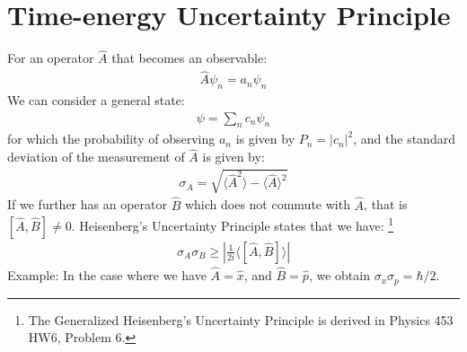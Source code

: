 \documentclass[11pt]{book}
\theoremstyle{break}
\theoremstyle{break}
\newcommand{\example}{\color{green}Example: \color{black}}
\begin{document}
\newpage
\section[Time-energy Uncertainty Principle]{\color{red}Time-energy Uncertainty Principle\color{black}}
For an operator $\hat{A}$ that becomes an observable:
\begin{align*}
\hat{A}\psi_n  = a_n \psi_n
\end{align*}
We can consider a general state:
\begin{align*}
\psi = \sum_n c_n \psi_n
\end{align*}
for which the probability of observing $a_n$ is given by $P_n = |c_n|^2$, and the standard deviation of the measurement of $\hat{A}$ is given by:
\begin{align*}
\sigma_A = \sqrt{\langle \hat{A}^2\rangle - \langle \hat{A}\rangle^2 }
\end{align*}
If we further has an operator $\hat{B}$ which does not commute with $\hat{A}$, that is $[\hat{A},\hat{B}] \neq 0$. Heisenberg's Uncertainty Principle states that we have: \footnote{The Generalized Heisenberg's Uncertainty Principle is derived in Physics 453 HW6, Problem 6.}
\begin{align*}
\sigma_A \sigma_B \geq \left|\frac{1}{2i}\langle [\hat{A},\hat{B}]\rangle\right|
\end{align*}
\example In the case where we have $\hat{A} = \hat{x}$, and $\hat{B} = \hat{p}$, we obtain $\sigma_{x}\sigma_p = \hbar/2$. \\
\end{document}

